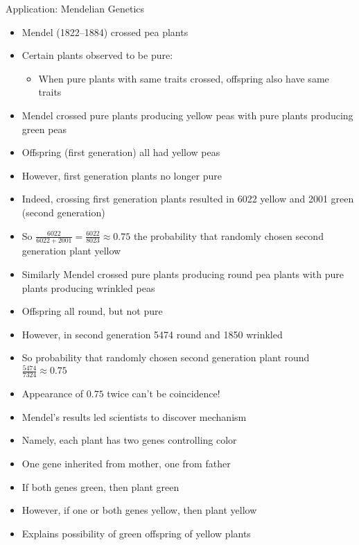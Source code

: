 \documentclass[handout]{beamer}
\theoremstyle{definition}
\begin{document}
\begin{frame}{Application: Mendelian Genetics}
\begin{itemize}
\item Mendel (1822--1884) crossed pea plants 
\item Certain plants observed to be \alert{pure}:
\begin{itemize}
\item When pure plants with same traits crossed,
offspring also have same traits
\end{itemize}
\item Mendel crossed pure plants producing yellow peas
with pure plants producing green peas
\item Offspring (\alert{first generation}) all had yellow peas
\item However, first generation plants no longer pure
\item Indeed, crossing first generation plants resulted in 
6022 yellow and 2001 green (\alert{second generation})
\item So 
$\frac{6022}{6022+2001}=\frac{6022}{8023}\approx 0.75$
the probability that randomly chosen second generation plant yellow

\end{itemize}
\end{frame}

\begin{frame}
\begin{itemize}
\item Similarly Mendel crossed pure plants
producing round pea plants with pure plants producing wrinkled peas
\item Offspring all round, but not pure
\item However, in second generation 5474 round and 1850 wrinkled
\item So probability that randomly chosen second generation plant round
$\frac{5474}{7324}\approx 0.75$
\end{itemize}
\end{frame}

\begin{frame}
\begin{itemize}
\item Appearance of $0.75$ twice can't be coincidence!
\item Mendel's results led scientists to discover mechanism
\item Namely, each plant has two \alert{genes} controlling color
\item One gene inherited from mother, one from father
\item If both genes green, then plant green
\item However, if one or both genes yellow, then plant yellow
\item Explains possibility of green offspring of yellow plants
\end{itemize}
\end{frame}
\end{document}
